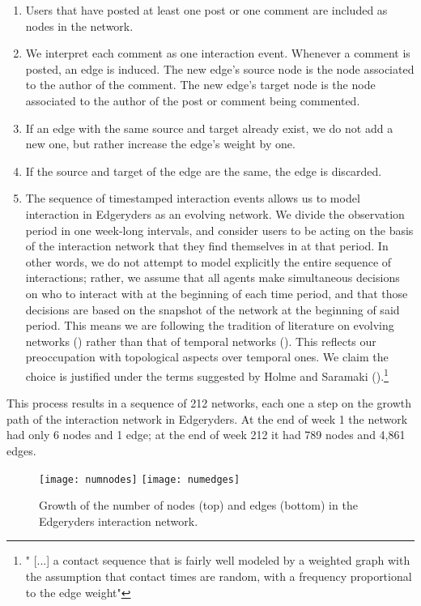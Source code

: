 \begin{enumerate}
	\item Users that have posted at least one post or one comment are included as nodes in the network.
	\item We interpret each comment as one interaction event. Whenever a comment is posted, an edge is induced. The new edge's source node is the node associated to the author of the comment. The new edge's target node is the node associated to the author of the post or comment being commented. 
	\item If an edge with the same source and target already exist, we do not add a new one, but rather increase the edge's weight by one.
	\item If the source and target of the edge are the same, the edge is discarded.  
	\item The sequence of timestamped interaction events allows us to model interaction in Edgeryders as an evolving network. We divide the observation period in one week-long intervals, and consider users to be acting on the basis of the interaction network that they find themselves in at that period. In other words, we do not attempt to model explicitly the entire sequence of interactions; rather, we assume that all agents make simultaneous decisions on who to interact with at the beginning of each time period, and that those decisions are based on the snapshot of the network at the beginning of said period. This means we are following the tradition of literature on evolving networks (\cite{dorogovtsev2002evolution}) rather than that of temporal networks (\cite{holme2012temporal}). This reflects our preoccupation with topological aspects over temporal ones. We claim the choice is justified under the terms suggested by Holme and Saramaki (\cite{holme2012temporal}).\footnote{" [...] a contact sequence that is fairly well modeled by a weighted graph with the assumption that contact times are random, with a frequency proportional to the edge weight"}

\end{enumerate}

This process results in a sequence of 212 networks, each one a step on the growth path of the interaction network in Edgeryders. At the end of week 1 the network had only 6 nodes and 1 edge; at the end of week 212 it had 789 nodes and 4,861 edges.

\begin{figure}
	\texttt{[image: numnodes]}
	\texttt{[image: numedges]}
	\caption{Growth of the number of nodes (top) and edges (bottom) in the Edgeryders interaction network.}
\label{fig:growthNodesEdges}
\end{figure}

